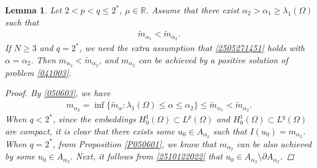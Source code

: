 \documentclass[10pt]{article}
\numberwithin{equation}{section}
\newtheorem{lemma}[theorem]{Lemma}
\numberwithin{equation}{section}
\begin{document}
\begin{lemma}\label{L050602}
Let $2<p<q\le 2^*$, $\mu\in \mathbb{R}$. Assume that there exist $\alpha_2>\alpha_1\ge\lambda_1(\Omega)$ such that 
\begin{equation}\label{050603}
\begin{aligned}
 \widetilde{m}_{\alpha_1}<\widetilde{m}_{\alpha_2}.
\end{aligned}
\end{equation}
If $N\ge 3$ and $q=2^*$, we need the extra assumption that \eqref{2505271451} holds with $\alpha= \alpha_2$. Then $m_{\alpha_2}<\widetilde{m}_{\alpha_2}$, and $m_{\alpha_2}$ can be achieved by a positive solution of problem \eqref{041003}.
\begin{proof}
By \eqref{050603}, we have
\begin{equation}\label{2510122022}
\begin{aligned}
m_{\alpha_2} = \inf\{\widetilde{m}_{\alpha}:\lambda_1(\Omega)\leq \alpha \leq \alpha_2\}
\leq \widetilde{m}_{\alpha_1}
<\widetilde{m}_{\alpha_2}.
\end{aligned}
\end{equation}
When $q<2^*$, since  the embeddings $H_0^1(\Omega)\subset L^p(\Omega)$ and $H_0^1(\Omega)\subset L^q(\Omega)$ are compact, it is clear that there exists some $u_0\in A_{\alpha_2}$ such that $I(u_0)=m_{\alpha_2}$. When $q=2^*$, from Proposition \ref{P050601}, we know that $m_{\alpha_2}$ can  be also achieved by some $u_0\in A_{\alpha_2}$. Next, it follows from \eqref{2510122022} that $u_0\in A_{\alpha_2}\setminus \partial A_{\alpha_2}$.
\end{proof}
\end{lemma}
\end{document}
